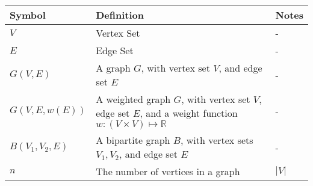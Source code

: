 \setlength{\arrayrulewidth}{0.5mm}
\setlength{\tabcolsep}{18pt}
\renewcommand{\arraystretch}{1.5}


\begin{table}
    \centering
    \begin{adjustwidth}{-0.75in}{-0.75in}

        \begin{tabular}{ |p{2cm}|p{6cm}|p{5cm}|  }
            \hline
            \textbf{Symbol}  & \textbf{Definition}                                                                                                 & \textbf{Notes}                \\
            \hline
            $V$              & Vertex Set                                                                                                          & -                             \\
            \hline
            $E$              & Edge Set                                                                                                            & -                             \\
            \hline

            $G(V, E)$        & A graph $G$, with vertex set $V$, and edge set $E$                                                                  & -                             \\
            \hline

            $G(V, E, w(E))$  & A weighted graph $G$, with vertex set $V$, edge set $E$, and a weight function $w: (V \times V) \mapsto \mathbb{R}$ & -                             \\
            \hline


            $B(V_1, V_2, E)$ & A bipartite graph $B$, with vertex sets $V_1, V_2$, and edge set $E$                                                & -                             \\
            \hline

            $n$              & The number of vertices in a graph                                                                                   & $|V|$                   \\
            \hline


\end{tabular}
\end{adjustwidth}
\end{table}
